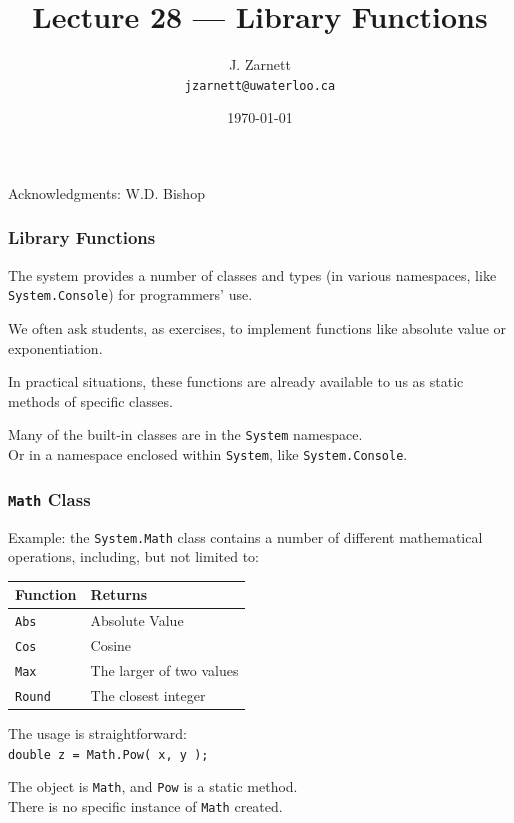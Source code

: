 

\title{Lecture 28 --- Library Functions }

\author{J. Zarnett\\
\texttt{jzarnett@uwaterloo.ca}}
\date{\today}



\begin{frame}
  \titlepage
  
  \begin{center}
  \small{Acknowledgments: W.D. Bishop}
  \end{center}
\end{frame}


\begin{frame}
\frametitle{Library Functions}
The system provides a number of classes and types (in various namespaces, like \texttt{System.Console}) for programmers' use.

We often ask students, as exercises, to implement functions like absolute value or exponentiation.

In practical situations, these functions are already available to us as static methods of specific classes.

Many of the built-in classes are in the \texttt{System} namespace.\\
\quad Or in a namespace enclosed within \texttt{System}, like \texttt{System.Console}.

\end{frame}

\begin{frame}
\frametitle{\texttt{Math} Class}
Example: the \texttt{System.Math} class contains a number of different mathematical operations, including, but not limited to:

\begin{center}
\begin{tabular}{l l}
\textbf{Function} & \textbf{Returns}\\ \hline
\texttt{Abs} & Absolute Value\\
\texttt{Cos} & Cosine\\
\texttt{Max} & The larger of two values\\
\texttt{Round} & The closest integer\\
\end{tabular}
\end{center}

The usage is straightforward:\\
\quad \texttt{double z = Math.Pow( x, y );}

The object is \texttt{Math}, and \texttt{Pow} is a static method. \\
\quad There is no specific instance of \texttt{Math} created.

\end{frame}

